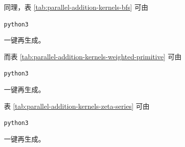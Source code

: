 同理，表 \ref{tab:parallel-addition-kernels-bfs} 可由
\begin{center}
\texttt{python3} 
\end{center}
一键再生成。

而表 \ref{tab:parallel-addition-kernels-weighted-primitive} 可由
\begin{center}
\texttt{python3} 
\end{center}
一键再生成。

表 \ref{tab:parallel-addition-kernels-zeta-series} 可由
\begin{center}
\texttt{python3} 
\end{center}
一键再生成。
